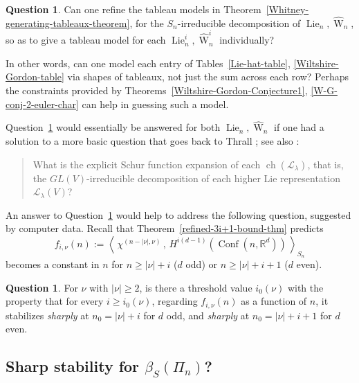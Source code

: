 \documentclass[12pt]{amsart}
\theoremstyle{plain}
\theoremstyle{definition}
\newtheorem{qn}[thm]{Question}
\begin{document}
\begin{qn}
\label{Whitney-generators-question}
Can one refine the tableau models in
Theorem~\ref{Whitney-generating-tableaux-theorem},
for the $S_n$-irreducible decomposition of ${{\operatorname{Lie}}}_n, \widehat{{\operatorname{W}}}_n$,
so as to give a tableau model for each ${{\operatorname{Lie}}}^i_n, \widehat{{\operatorname{W}}}^i_n$
individually?
\end{qn}

\noindent
In other words, can one model each entry of 
Tables~\eqref{Lie-hat-table}, \eqref{Wiltshire-Gordon-table} 
via shapes of tableaux,
not just the sum across each row?
Perhaps the constraints provided
by Theorems~\ref{Wiltshire-Gordon-Conjecture1},
\ref{W-G-conj-2-euler-char} can help in guessing
such a model.  

Question~\ref{Whitney-generators-question} would 
essentially be answered for both ${{\operatorname{Lie}}}_n, \widehat{{\operatorname{W}}}_n$
if one had a solution to a more basic question that goes 
back to Thrall \cite{Thrall}; see also \cite[Exer. 7.89(i)]{Stanley}:
\begin{quote}
What is the explicit Schur function expansion of each ${{\operatorname{ch}}}({{\mathcal{L}}}_\lambda)$,
that is, the $GL(V)$-irreducible decomposition of each higher Lie representation
${{\mathcal{L}}}_\lambda(V)$?
\end{quote}

An answer to Question~\ref{Whitney-generators-question}
would help to address the following question,
suggested by computer data.  Recall
that Theorem~\ref{refined-3i+1-bound-thm}
predicts 
$$
f_{i,\nu}(n)
:=\left\langle
\,
\chi^{(n-|\nu|,\nu)}
\, , \, H^{i(d-1)}({{\operatorname{Conf}}}(n,{{\mathbb{R}}}^d))
\,
\right\rangle_{S_n}
$$
becomes a constant in $n$ for $n \geq |\nu|+i$ ($d$ odd) or 
$n \geq |\nu|+i+1$ ($d$ even).

\begin{qn}
\label{precise-Whitney-stabilization-conj-remark}
For $\nu$ with $|\nu| \geq 2$, is there a threshold value $i_0(\nu)$ with the
property that for every $i \geq i_0(\nu)$, regarding 
$f_{i,\nu}(n)$ as a function of $n$, 
it stabilizes {\it sharply} at $n_0=|\nu|+i$ for $d$ odd,
and {\it sharply} at $n_0=|\nu|+i+1$ for $d$ even.
\end{qn}

\subsection{Sharp stability for $\beta_S(\Pi_n)$?}
\end{document}
